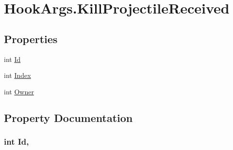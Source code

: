 \hypertarget{structOTA_1_1Plugin_1_1HookArgs_1_1KillProjectileReceived}{}\section{Hook\+Args.\+Kill\+Projectile\+Received}
\label{structOTA_1_1Plugin_1_1HookArgs_1_1KillProjectileReceived}
\subsection*{Properties}
\begin{DoxyCompactItemize}
\item 
int \hyperlink{structOTA_1_1Plugin_1_1HookArgs_1_1KillProjectileReceived_afe0b47b3c92f2f69ea3da50cb72553eb}{Id}
\item 
int \hyperlink{structOTA_1_1Plugin_1_1HookArgs_1_1KillProjectileReceived_a075e1e3c9dd399cef584d7338cc37938}{Index}
\item 
int \hyperlink{structOTA_1_1Plugin_1_1HookArgs_1_1KillProjectileReceived_a1b5549aee7b8f03889fac15e1cf22552}{Owner}
\end{DoxyCompactItemize}


\subsection{Property Documentation}
\hypertarget{structOTA_1_1Plugin_1_1HookArgs_1_1KillProjectileReceived_afe0b47b3c92f2f69ea3da50cb72553eb}{}
\subsubsection[{Id}]{\setlength{\rightskip}{0pt plus 5cm}int Id\hspace{0.3cm}{\ttfamily [get]}, {\ttfamily [set]}}\label{structOTA_1_1Plugin_1_1HookArgs_1_1KillProjectileReceived_afe0b47b3c92f2f69ea3da50cb72553eb}
\hypertarget{structOTA_1_1Plugin_1_1HookArgs_1_1KillProjectileReceived_a075e1e3c9dd399cef584d7338cc37938}{}
